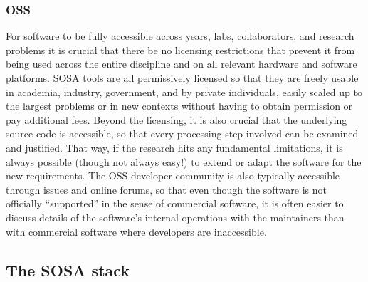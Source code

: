 \subsubsection{OSS}
For software to be fully accessible across years, labs, collaborators, and research problems it is crucial that there be no licensing restrictions that prevent it from being used across the entire discipline and on all relevant hardware and software platforms. SOSA tools are all permissively licensed so that they are freely usable in academia, industry, government, and by private individuals, easily scaled up to the largest problems or in new contexts without having to obtain permission or pay additional fees. Beyond the licensing, it is also crucial that the underlying source code is accessible, so that every processing step involved can be examined and justified. That way, if the research hits any fundamental limitations, it is always possible (though not always easy!) to extend or adapt the software for the new requirements. The OSS developer community is also typically accessible through issues and online forums, so that even though the software is not officially ``supported'' in the sense of commercial software, it is often easier to discuss details of the software's internal operations with the maintainers than with commercial software where developers are inaccessible.

\subsection{The SOSA stack}

